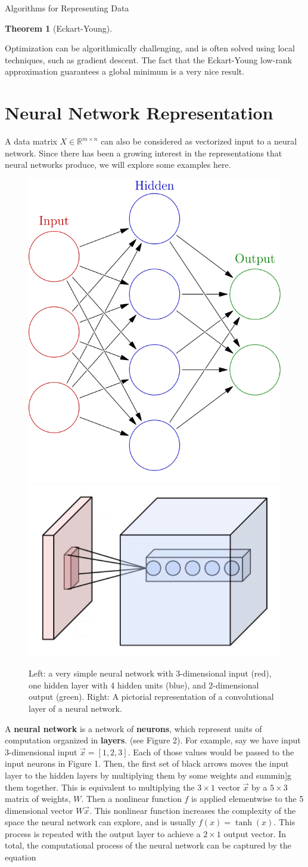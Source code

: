 \documentclass[12pt]{pom_thesis}
\newtheorem{theorem}{Theorem}
\begin{document}
\begin{chapter}{Algorithms for Representing Data}
\begin{theorem}[Eckart-Young]
\end{theorem}
Optimization can be algorithmically challenging, and is often solved using local techniques, such as gradient descent. The fact that the Eckart-Young low-rank approximation guarantees a global minimum is a very nice result. 
\section{Neural Network Representation}
A data matrix $X \in \mathbb{R}^{m \times n}$ can also be considered as vectorized input to a neural network. Since there has been a growing interest in the representations that neural networks produce, we will explore some examples here.  
\begin{figure}[h]
	\centering
	\includegraphics[width=.3\textwidth]{nn}
	\includegraphics[width=.5\textwidth]{Conv_layer}
	\caption{Left: a very simple neural network with 3-dimensional input (red),  one hidden layer with 4 hidden units (blue),  and 2-dimensional output (green). Right: A pictorial representation of a convolutional layer of a neural network.}
\end{figure}
A \textbf{neural network} is a network of \textbf{neurons}, which represent units of computation organized in \textbf{layers}. (see Figure 2). For example, say we have input 3-dimensional input $\vec{x} = [1,2,3] $. Each of those values would be passed to the input neurons in Figure 1. Then, the first set of black arrows moves the input layer to the hidden layers by multiplying them by some weights and summin]g them together. This is equivalent to multiplying the $3 \times 1$ vector $\vec{x}$ by a $5 \times 3$ matrix of weights, $W$. Then a nonlinear function $f$ is applied elementwise to the 5 dimensional vector $W\vec{x}$. This nonlinear function increases the complexity of the space the neural network can explore, and is usually $f(x) = \tanh(x)$. This process is repeated with the output layer to achieve a $2\times 1$ output vector. In total, the computational process of the neural network can be captured by the equation

\end{chapter}
\end{document}
